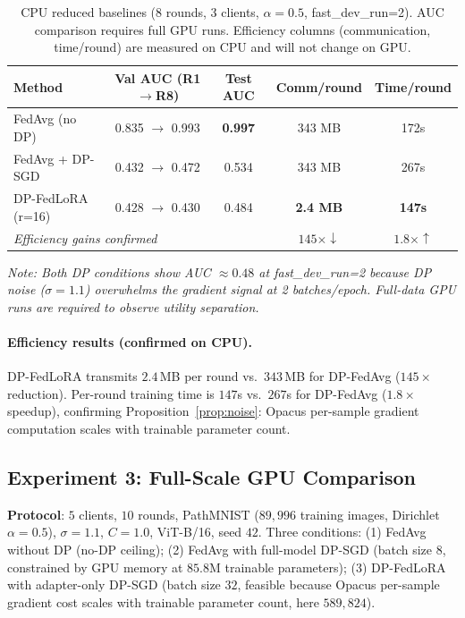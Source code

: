 ﻿\documentclass{article}
\newcommand{\method}{DP-FedLoRA}
\newcommand{\noise}{\sigma}
\newcommand{\clip}{C}
\begin{document}
\begin{table}[h]
\centering
\caption{CPU reduced baselines (8 rounds, 3 clients, $\alpha{=}0.5$,
fast\_dev\_run=2). AUC comparison requires full GPU runs.
Efficiency columns (communication, time/round) are measured on CPU and
will not change on GPU.}
\label{tab:cpu}
\begin{tabular}{lcccc}
\toprule
Method & Val AUC (R1$\to$R8) & Test AUC & Comm/round & Time/round \\
\midrule
FedAvg (no DP)    & 0.835 $\to$ 0.993 & \textbf{0.997} & 343 MB & 172s \\
FedAvg + DP-SGD   & 0.432 $\to$ 0.472 & 0.534          & 343 MB & 267s \\
\method{} (r=16)  & 0.428 $\to$ 0.430 & 0.484          & \textbf{2.4 MB} & \textbf{147s} \\
\midrule
\multicolumn{2}{l}{\textit{Efficiency gains confirmed}} & & $145{\times}\downarrow$ & $1.8{\times}\uparrow$ \\
\bottomrule
\end{tabular}
\vspace{-2pt}
\small \textit{Note: Both DP conditions show AUC $\approx 0.48$ at
fast\_dev\_run=2 because DP noise ($\noise{=}1.1$) overwhelms the gradient
signal at 2 batches/epoch. Full-data GPU runs are required to observe
utility separation.}
\end{table}

\paragraph{Efficiency results (confirmed on CPU).}
\method{} transmits $2.4$\,MB per round vs.\ $343$\,MB for DP-FedAvg
($145{\times}$ reduction).
Per-round training time is $147$s vs.\ $267$s for DP-FedAvg ($1.8{\times}$
speedup), confirming Proposition~\ref{prop:noise}: Opacus per-sample
gradient computation scales with trainable parameter count.

\subsection{Experiment 3: Full-Scale GPU Comparison}
\label{sec:exp:gpu}

\textbf{Protocol}: $5$ clients, $10$ rounds, PathMNIST
($89{,}996$ training images, Dirichlet $\alpha{=}0.5$),
$\noise{=}1.1$, $\clip{=}1.0$, ViT-B/16, seed $42$.
Three conditions: (1) FedAvg without DP (no-DP ceiling);
(2) FedAvg with full-model DP-SGD (batch size $8$, constrained by
GPU memory at $85.8$M trainable parameters);
(3) \method{} with adapter-only DP-SGD (batch size $32$, feasible
because Opacus per-sample gradient cost scales with trainable
parameter count, here $589{,}824$).
\end{document}
